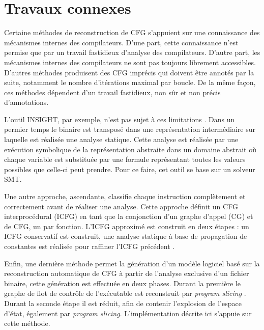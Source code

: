 \section{Travaux connexes}
\label{sec:related-work}


  Certaine méthodes de reconstruction de CFG s'appuient sur une connaissance des
  mécanismes internes des compilateurs. D'une part, cette connaissance n'est
  permise que par un travail fastidieux d'analyse des compilateurs. D'autre
  part, les mécanismes internes des compilateurs ne sont pas toujours librement
  accessibles. D'autres méthodes produisent des CFG imprécis qui doivent être
  annotés par la suite, notamment le nombre d'itérations maximal par boucle. De
  la même façon, ces méthodes dépendent d'un travail fastidieux, non sûr et non
  précis d'annotations.


  L'outil \textsc{INSIGHT}, par exemple, n'est pas sujet à ces limitations
  \cite{FLP15}. Dans un permier temps le binaire est transposé dans une
  représentation intermédiaire sur laquelle est réalisée une analyse
  statique. Cette analyse est réalisée par une exécution symbolique de la
  représentation abstraite dans un domaine abstrait où chaque variable est
  substituée par une formule représentant toutes les valeurs possibles que
  celle-ci peut prendre. Pour ce faire, cet outil se base sur un solveur SMT.


  Une autre approche, ascendante, classifie chaque instruction complètement et
  correctement avant de réaliser une analyse. Cette approche définit un CFG
  interprocédural (ICFG) en tant que la conjonction d'un graphe d'appel (CG) et
  de CFG, un par fonction. L'ICFG approximé est construit en deux étapes : un
  ICFG conservatif est construit, une analyse statique à base de propagation de
  constantes est réalisée pour raffiner l'ICFG précédent \cite{The00}.


  Enfin, une dernière méthode \cite{CB13} permet la génération d'un modèle
  logiciel basé sur la reconstruction automatique de CFG à partir de l'analyse
  exclusive d'un fichier binaire, cette génération est effectuée en deux
  phases. Durant la première le graphe de flot de contrôle de l'exécutable est
  reconstruit par \textit{program slicing} \cite{Wei81, Tip95}. Durant la
  seconde étape il est réduit, afin de contenir l'explosion de l'espace d'état,
  également par \textit{program slicing}. L'implémentation décrite ici s'appuie
  sur cette méthode.

